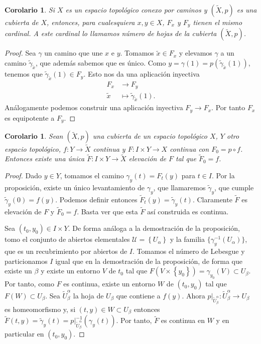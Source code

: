 \documentclass[12pt,a4paper]{book}
\newtheorem{corol}[thm]{Corolario}
\theoremstyle{definition} \newtheorem{defn}[thm]{Definición}
\theoremstyle{definition} \newtheorem{ejemplo}[thm]{Ejemplo}
\theoremstyle{definition} \newtheorem{ejercicio}[thm]{Ejercicio}
\theoremstyle{remark} \newtheorem*{obs}{Observación}
\def\XX{\tilde{X}}
\def\xx{\tilde{x}}
\begin{document}
\begin{corol}
  Si $X$ es un espacio topológico conexo por caminos y $(\XX,p)$ es una cubierta de $X$, entonces, para cualesquiera $x,y\in X$, $F_x$ y $F_y$ tienen el mismo cardinal. A este cardinal lo llamamos \emph{número de hojas} de la cubierta $(\XX,p)$.
\end{corol}
\begin{proof}
  Sea $\gamma$ un camino que une $x$ e $y$. Tomamos $\xx\in F_x$ y elevamos $\gamma$ a un camino $\tilde{\gamma}_{\xx}$, que además sabemos que es único. Como $y=\gamma(1)=p(\tilde{\gamma}_{\xx}(1))$, tenemos que $\tilde{\gamma}_{\xx}(1)\in F_y$. Esto nos da una aplicación inyectiva
  \begin{align*}
     F_x&\longrightarrow F_y\\ 
     \xx &\longmapsto \tilde{\gamma}_{\xx}(1). 
    \end{align*}
    Análogamente podemos construir una aplicación inyectiva $F_y\rightarrow F_x$. Por tanto $F_x$ es equipotente a $F_y$.
\end{proof}

\begin{corol}\label{elevhomot}
  Sean $(\XX,p)$ una cubierta de un espacio topológico $X$, $Y$ otro espacio topológico, $f:Y\rightarrow \XX$ continua y $F:I\times Y\rightarrow X$ continua con $F_0=p\circ f$. Entonces existe una única $\tilde{F}:I\times Y \rightarrow \XX$ elevación de $F$ tal que $\tilde{F}_0=f$.
\end{corol}
\begin{proof}
  Dado $y \in Y$, tomamos el camino $\gamma_y(t)=F_t(y)$ para $t\in I$. Por la proposición, existe un único levantamiento de $\gamma_y$, que llamaremos $\tilde{\gamma}_y$, que cumple $\tilde{\gamma}_y(0)=f(y)$. Podemos definir entonces $\tilde{F}_t(y)=\tilde{\gamma}_y(t)$. Claramente $\tilde{F}$ es elevación de $F$ y $\tilde{F}_0=f$. Basta ver que esta $\tilde{F}$ así construida es continua.

  Sea $(t_0,y_0)\in I \times Y$. De forma análoga a la demostración de la proposición, tomo el conjunto de abiertos elementales $\mathcal{U}=\left\{ U_{\alpha} \right\}$ y la familia $\{\gamma_{y}^{-1}(U_{\alpha})\}$, que es un recubrimiento por abiertos de $I$. Tomamos el número de Lebesgue y particionamos $I$ igual que en la demostración de la proposición, de forma que existe un $\beta$ y existe un entorno $V$ de $t_0$ tal que $F(V\times\left\{ y_0 \right\})=\gamma_{y_0}(V)\subset U_{\beta}$. Por tanto, como $F$ es continua, existe un entorno $W$ de $(t_0,y_0)$ tal que $F(W)\subset U_{\beta}$. Sea $\tilde{U}^{\alpha}_\beta$ la hoja de $U_\beta$ que contiene a $f(y)$. Ahora $p|_{\tilde{U}^{\alpha}_{\beta}}:\tilde{U}^{\alpha}_{\beta}\rightarrow U_\beta$ es homeomorfismo y, si $(t,y)\in W\subset U_{\beta}$ entonces $\tilde{F}(t,y)=\tilde{\gamma}_y(t)=p|_{\tilde{U}^{\alpha}_{\beta}}^{-1}(\gamma_y(t))$. Por tanto, $\tilde{F}$ es continua en $W$ y en particular en $(t_0,y_0)$.
\end{proof}
\end{document}
